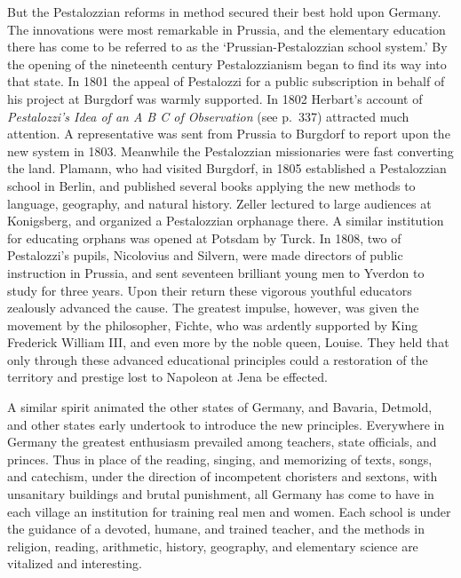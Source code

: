 \documentclass[
]{book}
\begin{document}
But the Pestalozzian reforms in method secured their best hold upon Germany. The innovations were most remarkable in Prussia, and the elementary education there has come to be referred to as the `Prussian-Pestalozzian school system.' By the opening of the nineteenth century Pestalozzianism began to find its way into that state. In 1801 the appeal of Pestalozzi for a public subscription in behalf of his project at Burgdorf was warmly supported. In 1802 Herbart's account of \emph{Pestalozzi's Idea of an A B C of Observation} (see p.~337) attracted much attention. A representative was sent from Prussia to Burgdorf to report upon the new system in 1803. Meanwhile the Pestalozzian missionaries were fast converting the land. Plamann, who had visited Burgdorf, in 1805 established a Pestalozzian school in Berlin, and published several books applying the new methods to language, geography, and natural history. Zeller lectured to large audiences at Konigsberg, and organized a Pestalozzian orphanage there. A similar institution for educating orphans was opened at Potsdam by Turck. In 1808, two of Pestalozzi's pupils, Nicolovius and Silvern, were made directors of public instruction in Prussia, and sent seventeen brilliant young men to Yverdon to study for three years. Upon their return these vigorous youthful educators zealously advanced the cause. The greatest impulse, however, was given the movement by the philosopher, Fichte, who was ardently supported by King Frederick William III, and even more by the noble queen, Louise. They held that only through these advanced educational principles could a restoration of the territory and prestige lost to Napoleon at Jena be effected.

A similar spirit animated the other states of Germany, and Bavaria, Detmold, and other states early undertook to introduce the new principles. Everywhere in Germany the greatest enthusiasm prevailed among teachers, state officials, and princes. Thus in place of the reading, singing, and memorizing of texts, songs, and catechism, under the direction of incompetent choristers and sextons, with unsanitary buildings and brutal punishment, all Germany has come to have in each village an institution for training real men and women. Each school is under the guidance of a devoted, humane, and trained teacher, and the methods in religion, reading, arithmetic, history, geography, and elementary science are vitalized and interesting.
\end{document}
